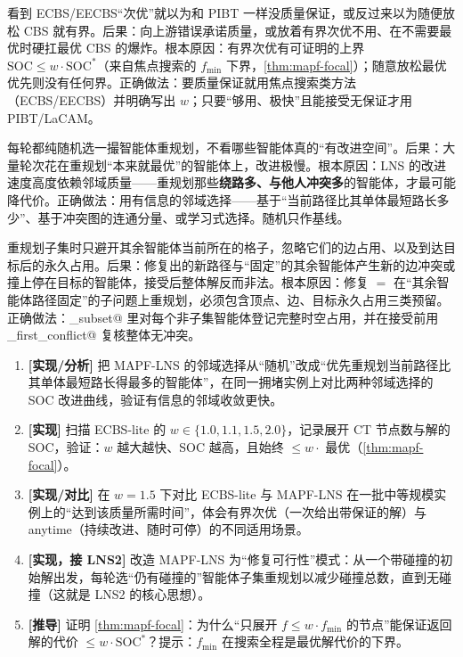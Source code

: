\begin{pitfall}
看到 ECBS/EECBS“次优”就以为和 PIBT 一样没质量保证，或反过来以为随便放松 CBS 就有界。后果：向上游错误承诺质量，或放着有界次优不用、在不需要最优时硬扛最优 CBS 的爆炸。根本原因：有界次优有可证明的上界 $\mathrm{SOC}\le w\cdot\mathrm{SOC}^*$（来自焦点搜索的 $f_{\min}$ 下界，\cref{thm:mapf-focal}）；随意放松最优优先则没有任何界。正确做法：要质量保证就用焦点搜索类方法（ECBS/EECBS）并明确写出 $w$；只要“够用、极快”且能接受无保证才用 PIBT/LaCAM。
\end{pitfall}

\begin{pitfall}
每轮都纯随机选一撮智能体重规划，不看哪些智能体真的“有改进空间”。后果：大量轮次花在重规划“本来就最优”的智能体上，改进极慢。根本原因：LNS 的改进速度高度依赖邻域质量——重规划那些\textbf{绕路多、与他人冲突多}的智能体，才最可能降代价。正确做法：用有信息的邻域选择——基于“当前路径比其单体最短路长多少”、基于冲突图的连通分量、或学习式选择。随机只作基线。
\end{pitfall}

\begin{pitfall}
重规划子集时只避开其余智能体当前所在的格子，忽略它们的边占用、以及到达目标后的永久占用。后果：修复出的新路径与“固定”的其余智能体产生新的边冲突或撞上停在目标的智能体，接受后整体解反而非法。根本原因：修复 $=$ 在“其余智能体路径固定”的子问题上重规划，必须包含顶点、边、目标永久占用三类预留。正确做法：\verb@replan_subset@ 里对每个非子集智能体登记完整时空占用，并在接受前用 \verb@find_first_conflict@ 复核整体无冲突。
\end{pitfall}

\begin{exercise}
\begin{enumerate}
  \item \textbf{[实现/分析]} 把 MAPF-LNS 的邻域选择从“随机”改成“优先重规划当前路径比其单体最短路长得最多的智能体”，在同一拥堵实例上对比两种邻域选择的 SOC 改进曲线，验证有信息的邻域收敛更快。
  \item \textbf{[实现]} 扫描 ECBS-lite 的 $w\in\{1.0,1.1,1.5,2.0\}$，记录展开 CT 节点数与解的 SOC，验证：$w$ 越大越快、SOC 越高，且始终 $\le w\cdot$ 最优（\cref{thm:mapf-focal}）。
  \item \textbf{[实现/对比]} 在 $w=1.5$ 下对比 ECBS-lite 与 MAPF-LNS 在一批中等规模实例上的“达到该质量所需时间”，体会有界次优（一次给出带保证的解）与 anytime（持续改进、随时可停）的不同适用场景。
  \item \textbf{[实现，接 LNS2]} 改造 MAPF-LNS 为“修复可行性”模式：从一个带碰撞的初始解出发，每轮选“仍有碰撞的”智能体子集重规划以减少碰撞总数，直到无碰撞（这就是 LNS2 的核心思想）。
  \item \textbf{[推导]} 证明 \cref{thm:mapf-focal}：为什么“只展开 $f\le w\cdot f_{\min}$ 的节点”能保证返回解的代价 $\le w\cdot\mathrm{SOC}^*$？提示：$f_{\min}$ 在搜索全程是最优解代价的下界。
\end{enumerate}
\end{exercise}

